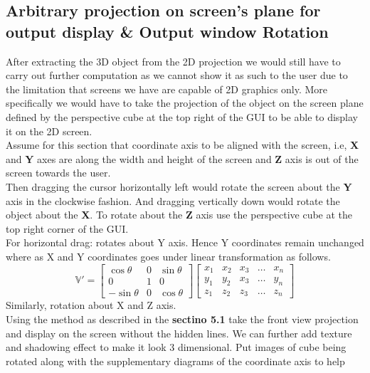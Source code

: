 \subsection{Arbitrary projection on screen's plane for output display \& Output window Rotation}
After extracting the 3D object from the 2D projection we would still have to carry out further computation as we cannot show it as such to the user due to the limitation that screens we have are capable of 2D graphics only. More specifically we would have to take the projection of the object on the screen plane defined by the perspective cube at the top right of the GUI to be able to display it on the 2D screen.\\
Assume for this section that coordinate axis to be aligned with the screen, i.e, \textbf{X} and \textbf{Y} axes are along the width and height of the screen and \textbf{Z} axis is out of the screen towards the user. \\
Then dragging the cursor horizontally left would rotate the screen about the \textbf{Y} axis in the clockwise fashion. And dragging vertically down would rotate the object about the \textbf{X}.
To rotate about the \textbf{Z} axis use the perspective cube at the top right corner of the GUI.\\
For horizontal drag: rotates about Y axis. Hence Y coordinates remain unchanged where as X and Y coordinates goes under linear transformation as follows. 
$$
\mathbb{V}' = 
	\begin{bmatrix}
    \cos\theta &  0 & \sin\theta \\
    0 & 1 & 0 \\
    - \sin\theta & 0 & \cos\theta
    \end{bmatrix}
    \begin{bmatrix}
    x_{1}       & x_{2} & x_{3} & \dots & x_{n} \\
    y_{1}       & y_{2} & x_{3} & \dots & y_{n} \\
    z_{1}       & z_{2} & z_{3} & \dots & z_{n}
\end{bmatrix}
$$
Similarly, rotation about X and Z axis.\\
Using the method as described in the \textbf{sectino 5.1} take the front view projection and display on the screen without the hidden lines. We can further add texture and shadowing effect to make it look 3 dimensional.
Put images of cube being rotated along with the supplementary diagrams of the coordinate axis to help
\\
\\
\\
\\






